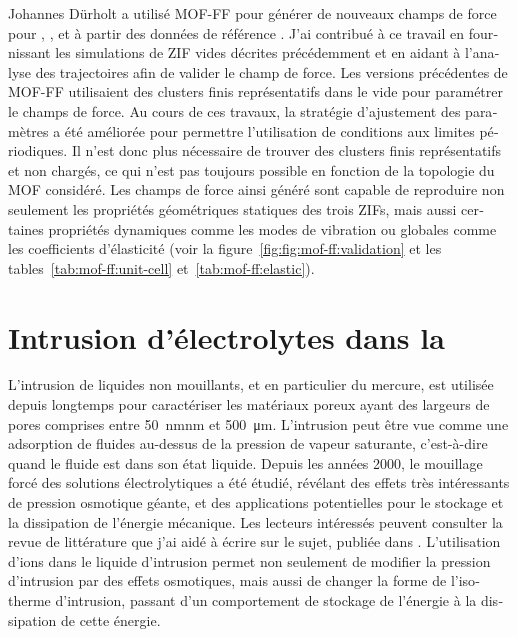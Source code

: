 \documentclass[thesis]{subfiles}
\begin{document}
\begin{otherlanguage}{french}
Johannes Dürholt a utilisé MOF-FF pour générer de nouveaux champs de force pour
, \ZIFCl, et \ZIFBr à partir des données de référence \abinitio. J'ai
contribué à ce travail en fournissant les simulations de ZIF vides décrites
précédemment et en aidant à l'analyse des trajectoires afin de valider le champ
de force. Les versions précédentes de MOF-FF utilisaient des clusters finis
représentatifs dans le vide pour paramétrer le champs de force. Au cours de ces
travaux, la stratégie d'ajustement des paramètres a été améliorée pour permettre
l'utilisation de conditions aux limites périodiques. Il n'est donc plus
nécessaire de trouver des clusters finis représentatifs et non chargés, ce qui
n'est pas toujours possible en fonction de la topologie du MOF considéré.  Les
champs de force ainsi généré sont capable de reproduire non seulement les
propriétés géométriques statiques des trois ZIFs, mais aussi certaines
propriétés dynamiques comme les modes de vibration ou globales comme les
coefficients d'élasticité (voir la figure~\ref{fig:fig:mof-ff:validation} et les
tables~\ref{tab:mof-ff:unit-cell} et~\ref{tab:mof-ff:elastic}).

\clearpage
\section{Intrusion d'électrolytes dans la }

L'intrusion de liquides non mouillants, et en particulier du mercure, est
utilisée depuis longtemps pour caractériser les matériaux poreux ayant des
largeurs de pores comprises entre \SI{50}{nm}{nm} et
\SI{500}{\um}\cite{Rouquerol2011}. L'intrusion peut être vue comme une
adsorption de fluides au-dessus de la pression de vapeur saturante, c'est-à-dire
quand le fluide est dans son état liquide. Depuis les années 2000, le mouillage
forcé des solutions électrolytiques a été étudié, révélant des effets très
intéressants de pression osmotique géante\cite{Liu2009, MichelinJamois2015}, et
des applications potentielles pour le stockage et la dissipation de l'énergie
mécanique\cite{Eroshenko2001}. Les lecteurs intéressés peuvent consulter la
revue de littérature que j'ai aidé à écrire sur le sujet, publiée dans
\cite{Fraux2017-2}. L'utilisation d'ions dans le
liquide d'intrusion permet non seulement de modifier la pression d'intrusion par
des effets osmotiques\cite{Tzanis2014, Khay2014}, mais aussi de changer la forme
de l'isotherme d'intrusion, passant d'un comportement de stockage de l'énergie à
la dissipation de cette énergie\cite{Ryzhikov2014}.


\end{otherlanguage}
\end{document}
